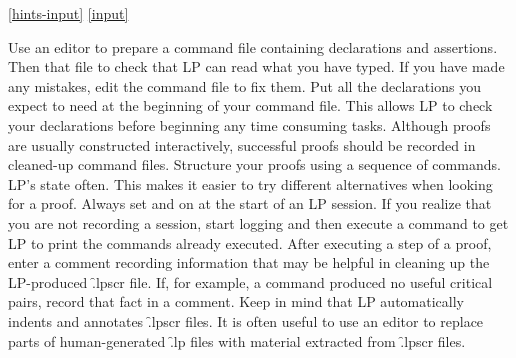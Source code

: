 \ref{hints-input}
\ref{input}

Use an editor to prepare a command file containing declarations and assertions.
Then  that file to check that LP can read what you have typed.
If you have made any mistakes, edit the command file to fix them.
\p
Put all the declarations you expect to need at the beginning of your command
file.  This allows LP to check your declarations before beginning any time
consuming tasks.
\p
Although proofs are usually constructed interactively, successful proofs should
be recorded in cleaned-up command files.  Structure your proofs using a
sequence of  commands.
\p
{} LP's state often.  This makes it easier
to try different alternatives when looking for a proof.
\p
Always set  and
 on at the start of an LP session.  If you
realize that you are not recording a session, start logging and then execute a
 command to get LP to print the 
commands already executed.  After executing a step of a proof, enter a comment
recording information that may be helpful in cleaning up the LP-produced
\f{.lpscr} file.  If, for example, a  command produced 
no useful critical pairs, record that fact in a comment.
\p
Keep in mind that LP automatically indents and annotates \f{.lpscr} files.
It is often useful to use an editor to replace parts of human-generated 
\f{.lp} files with material extracted from \f{.lpscr} files.

